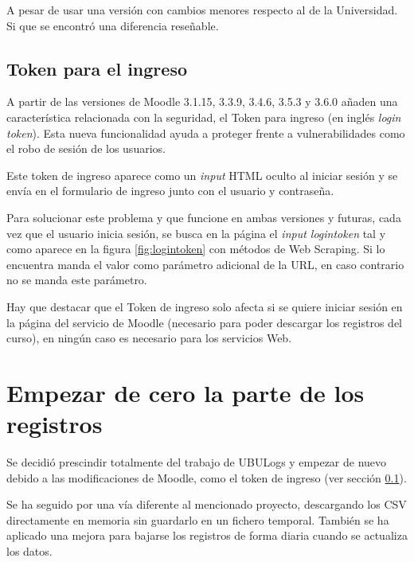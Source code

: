 A pesar de usar una versión con cambios menores respecto al de la Universidad. Si que se encontró una diferencia reseñable. 

\subsection{Token para el ingreso} \label{sec:logintoken}
A partir de las versiones de Moodle 3.1.15, 3.3.9, 3.4.6, 3.5.3 y 3.6.0 añaden una característica relacionada con la seguridad, el Token para ingreso \cite{noauthor_token_nodate} (en inglés \textit{login token}). Esta nueva funcionalidad ayuda a proteger frente a vulnerabilidades como el robo de sesión de los usuarios. 

Este token de ingreso aparece como un \textit{input} HTML oculto\cite{noauthor_html_nodate} al iniciar sesión y se envía en el formulario de ingreso junto con el usuario y contraseña.


Para solucionar este problema y que funcione en ambas versiones y futuras, cada vez que el usuario inicia sesión, se busca en la página el \textit{input logintoken} tal y como aparece en la figura \ref{fig:logintoken} con métodos de Web Scraping\cite{marti_que_2016}. Si lo encuentra manda el valor como parámetro adicional de la URL, en caso contrario no se manda este parámetro.

Hay que destacar que el Token de ingreso solo afecta si se quiere iniciar sesión en la página del servicio de Moodle (necesario para poder descargar los registros del curso), en ningún caso es necesario para los servicios Web.

\section{Empezar de cero la parte de los registros}

Se decidió prescindir totalmente del trabajo de UBULogs y empezar de nuevo debido a las modificaciones de Moodle, como el token de ingreso (ver sección \ref{sec:logintoken}). 

Se ha seguido por una vía diferente al mencionado proyecto, descargando los CSV directamente en memoria sin guardarlo en un fichero temporal. También se ha aplicado una mejora para bajarse los registros de forma diaria cuando se actualiza los datos.

